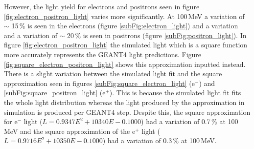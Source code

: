 However, the light yield for electrons and positrons seen in figure \ref{fig:electron_positron_light} varies more significantly. At 100\,MeV a variation of $\sim$ 15\,\% is seen in the electrons (figure \ref{subFig:electron_light}) and a variation and a variation of $\sim$ 20\,\% is seen in positrons (figure \ref{subFig:positron_light}). In figure \ref{fig:electron_positron_light} the simulated light which is a square function more accurately represents the GEANT4 light predictions. Figure \ref{fig:square_electron_positron_light} shows this approximation inputted instead. There is a slight variation between the simulated light fit and the square approximation seen in figures \ref{subFig:square_electron_light} (e$^-$) and \ref{subFig:square_positron_light} (e$^+$). This is because the simulated light fit fits the whole light distribution whereas the light produced by the approximation in simulation is produced per GEANT4 step. Despite this, the square approximation for e$^-$ light ($L = 0.9347E^2 + 10340E - 0.1000$) had a variation of 0.7\,\% at 100\,MeV and the square approximation of the e$^+$ light ($L = 0.9716E^2 + 10350E -0.1000$) had a variation of 0.3\,\% at 100\,MeV. 
